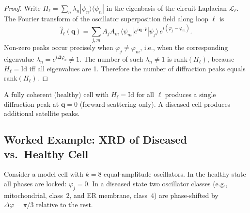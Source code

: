 \begin{proof}
Write $H_\ell = \sum_n \lambda_n |\psi_n\rangle\langle\psi_n|$ in the
eigenbasis of the circuit Laplacian $\mathcal{L}_\ell$.  The Fourier
transform of the oscillator superposition field along loop $\ell$ is
\begin{equation}
    \hat{I}_\ell(\mathbf{q})
        = \sum_{j,m} A_j A_m\,
          \langle\psi_m | e^{i\mathbf{q}\cdot\hat{\mathbf{r}}} | \psi_j\rangle
          \,e^{i(\varphi_j - \varphi_m)}.
\end{equation}
Non-zero peaks occur precisely when $\varphi_j \neq \varphi_m$, i.e., when
the corresponding eigenvalue $\lambda_n = e^{i\Delta\varphi_n} \neq 1$.
The number of such $\lambda_n \neq 1$ is $\mathrm{rank}(H_\ell)$, because
$H_\ell = \mathrm{Id}$ iff all eigenvalues are 1.  Therefore the number of
diffraction peaks equals $\mathrm{rank}(H_\ell)$.
\end{proof}

\begin{corollary}
\label{cor:ch04-healthy-diffraction}
A fully coherent (healthy) cell with $H_\ell = \mathrm{Id}$ for all $\ell$
produces a single diffraction peak at $\mathbf{q} = 0$ (forward scattering
only).  A diseased cell produces additional satellite peaks.
\end{corollary}

\subsection{Worked Example: XRD of Diseased vs.\ Healthy Cell}

Consider a model cell with $k = 8$ equal-amplitude oscillators.  In the
healthy state all phases are locked: $\varphi_j = 0$.  In a diseased state
two oscillator classes (e.g., mitochondrial, class~2, and ER membrane,
class~4) are phase-shifted by $\Delta\varphi = \pi/3$ relative to the rest.

